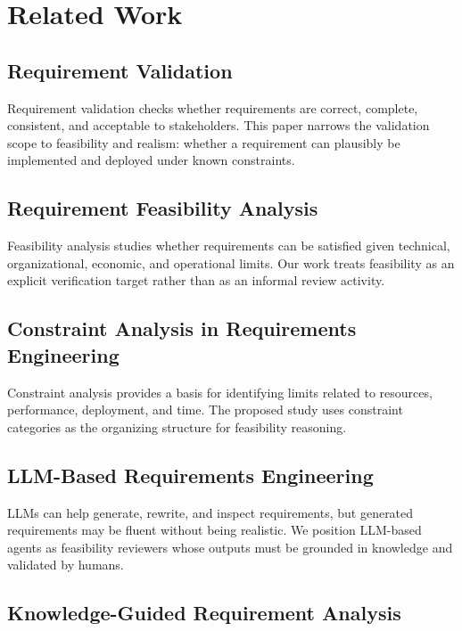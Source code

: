 \section{Related Work}
\label{related_work}

\subsection{Requirement Validation}
\label{rw:validation}

Requirement validation checks whether requirements are correct, complete, consistent, and acceptable to stakeholders.
This paper narrows the validation scope to feasibility and realism: whether a requirement can plausibly be implemented and deployed under known constraints.

\subsection{Requirement Feasibility Analysis}
\label{rw:feasibility}

Feasibility analysis studies whether requirements can be satisfied given technical, organizational, economic, and operational limits.
Our work treats feasibility as an explicit verification target rather than as an informal review activity.

\subsection{Constraint Analysis in Requirements Engineering}
\label{rw:constraint}

Constraint analysis provides a basis for identifying limits related to resources, performance, deployment, and time.
The proposed study uses constraint categories as the organizing structure for feasibility reasoning.

\subsection{LLM-Based Requirements Engineering}
\label{rw:llm_re}

LLMs can help generate, rewrite, and inspect requirements, but generated requirements may be fluent without being realistic.
We position LLM-based agents as feasibility reviewers whose outputs must be grounded in knowledge and validated by humans.

\subsection{Knowledge-Guided Requirement Analysis}
\label{rw:knowledge}


